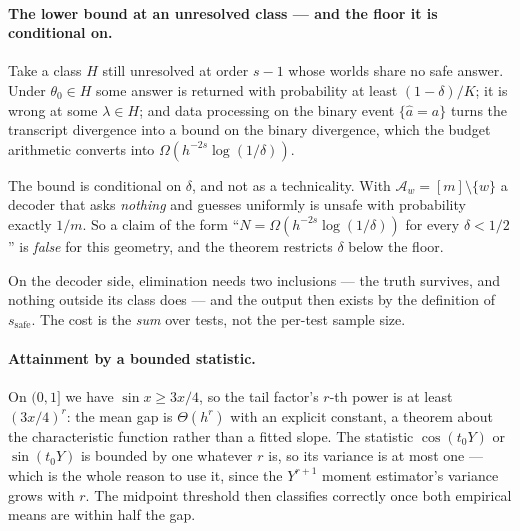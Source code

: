 \paragraph{The lower bound at an unresolved class --- and the floor it is conditional on.}
Take a class $H$ still unresolved at order $s-1$ whose worlds share no safe answer. Under
$\theta_{0}\in H$ some answer is returned with probability at least $(1-\delta)/K$; it is
wrong at some $\lambda\in H$; and data processing on the binary event
$\{\widehat a = a\}$ turns the transcript divergence into a bound on the binary divergence,
which the budget arithmetic converts into $\Omega(h^{-2s}\log(1/\delta))$.

The bound is conditional on $\delta$, and not as a technicality. With
$\mathcal A_{w}=[m]\setminus\{w\}$ a decoder that asks \emph{nothing} and guesses uniformly is
unsafe with probability exactly $1/m$. So a claim of the form ``$N=\Omega(h^{-2s}\log(1/\delta))$
for every $\delta<1/2$'' is \emph{false} for this geometry, and the theorem restricts $\delta$
below the floor.

On the decoder side, elimination needs two inclusions --- the truth survives, and nothing
outside its class does --- and the output then exists by the definition of
$s_{\mathrm{safe}}$. The cost is the \emph{sum} over tests, not the per-test sample size.


\paragraph{Attainment by a bounded statistic.}
On $(0,1]$ we have $\sin x\ge 3x/4$, so the tail factor's $r$-th power is at least
$(3x/4)^{r}$: the mean gap is $\Theta(h^{r})$ with an explicit constant, a theorem about the
characteristic function rather than a fitted slope. The statistic $\cos(t_{0}Y)$ or
$\sin(t_{0}Y)$ is bounded by one whatever $r$ is, so its variance is at most one --- which is
the whole reason to use it, since the $Y^{r+1}$ moment estimator's variance grows with $r$.
The midpoint threshold then classifies correctly once both empirical means are within half the
gap.


